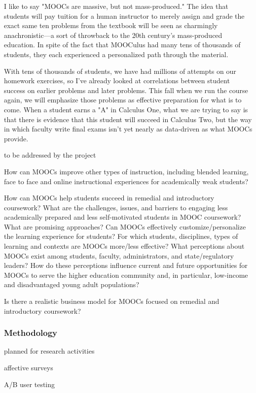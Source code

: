 \documentclass[12pt]{article}
\begin{document}
I like to say "MOOCs are massive, but not mass-produced."  The idea
that students will pay tuition for a human instructor to merely assign
and grade the exact same ten problems from the textbook will be seen
as charmingly anachronistic---a sort of throwback to the 20th
century's mass-produced education.  In spite of the fact that MOOCulus
had many tens of thousands of students, they each experienced a
personalized path through the material.

With tens of thousands of students, we have had millions of attempts
on our homework exercises, so I've already looked at correlations
between student success on earlier problems and later problems.  This
fall when we run the course again, we will emphasize those problems as
effective preparation for what is to come.  When a student earns a "A"
in Calculus One, what we are trying to say is that there is evidence
that this student will succeed in Calculus Two, but the way in which
faculty write final exams isn't yet nearly as data-driven as what
MOOCs provide.

to be addressed by the project

How can MOOCs improve other types of instruction, including blended
learning, face to face and online instructional experiences for
academically weak students?

How can MOOCs help students succeed in remedial and introductory
coursework?  What are the challenges, issues, and barriers to engaging
less academically prepared and less self-motivated students in MOOC
coursework? What are promising approaches?  Can MOOCs effectively
customize/personalize the learning experience for students?  For which
students, disciplines, types of learning and contexts are MOOCs
more/less effective?  What perceptions about MOOCs exist among
students, faculty, administrators, and state/regulatory leaders? How
do these perceptions influence current and future opportunities for
MOOCs to serve the higher education community and, in particular,
low-income and disadvantaged young adult populations?

Is there a realistic business model for MOOCs focused on remedial and introductory coursework?

\subsubsection*{Methodology}

planned for research activities

affective surveys

A/B user testing
\end{document}
